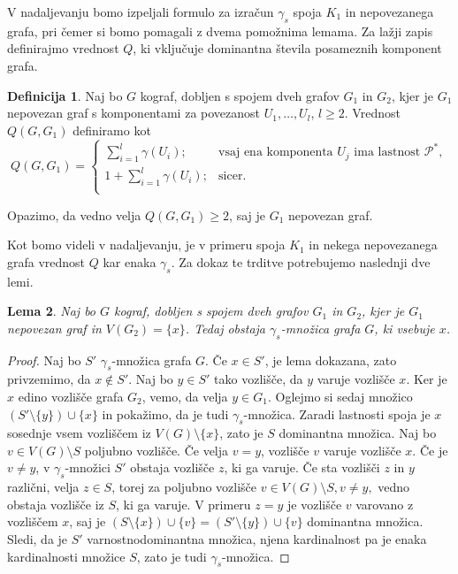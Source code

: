 \documentclass[12pt,a4paper,twoside]{article}
\theoremstyle{definition} %
\newtheorem{definicija}{Definicija}[section]
\theoremstyle{plain} %
\newtheorem{lema}[definicija]{Lema}
\numberwithin{equation}{section}  %
\begin{document}
V nadaljevanju bomo izpeljali formulo za izračun $\gamma_s$ spoja $K_1$ in nepovezanega grafa, pri čemer si bomo pomagali z dvema pomožnima lemama. Za lažji zapis definirajmo vrednost $Q$, ki vključuje dominantna števila posameznih komponent grafa.

\begin{definicija}Naj bo $G$ kograf, dobljen s spojem dveh grafov $G_1$ in $G_2$, kjer je $G_1$ nepovezan graf s komponentami za povezanost $U_1, \dots, U_l$, $l \geq 2$. Vrednost $Q(G, G_1)$ definiramo kot
$$Q(G, G_1) = 
  \begin{cases}
    \sum\limits_{i=1}^l \gamma(U_i); & \text{vsaj ena komponenta } U_j \text{ ima lastnost } \mathcal{P^*}, \\
    1 + \sum\limits_{i=1}^l \gamma(U_i); & \text{sicer. }\\
  \end{cases}
  $$
\end{definicija}
Opazimo, da vedno velja $Q(G, G_1) \geq 2$, saj je $G_1$ nepovezan graf.

Kot bomo videli v nadaljevanju, je v primeru spoja $K_1$ in nekega nepovezanega grafa vrednost $Q$ kar enaka $\gamma_s$. Za dokaz te trditve potrebujemo naslednji dve lemi.

\begin{lema}\label{Lema6}Naj bo $G$ kograf, dobljen s spojem dveh grafov $G_1$ in $G_2$, kjer je $G_1$ nepovezan graf in $V(G_2) = \{x\}$. Tedaj obstaja $\gamma_s$-množica grafa $G$, ki vsebuje $x$.
\end{lema}
\begin{proof}
Naj bo $S'$ $\gamma_s$-množica grafa $G$. Če $x \in S'$, je lema dokazana, zato privzemimo, da $x \not\in S'$. Naj bo $y\in S'$ tako vozlišče, da $y$ varuje vozlišče $x$. Ker je $x$ edino vozlišče grafa $G_2$, vemo, da velja $y \in G_1$. Oglejmo si sedaj množico $(S' \setminus \{y\}) \cup \{x\}$ in pokažimo, da je tudi $\gamma_s$-množica. Zaradi lastnosti spoja je $x$ sosednje vsem vozliščem iz $V(G) \setminus \{x\}$, zato je $S$ dominantna množica. Naj bo $v \in V(G) \setminus S$ poljubno vozlišče. Če velja $v=y$, vozlišče $v$ varuje vozlišče $x$. Če je $v \neq y$, v $\gamma_s$-množici $S'$ obstaja vozlišče $z$, ki ga varuje. Če sta vozlišči $z$ in $y$ različni, velja $z \in S$, torej za poljubno vozlišče $v \in V(G) \setminus S, v \neq y,$ vedno obstaja vozlišče iz $S$, ki ga varuje. V primeru $z = y$ je vozlišče $v$ varovano z vozliščem $x$, saj je $(S \setminus \{x\}) \cup \{v\} = (S' \setminus \{y\}) \cup \{v\}$ dominantna množica. Sledi, da je $S'$ varnostnodominantna množica, njena kardinalnost pa je enaka kardinalnosti množice $S$, zato je tudi $\gamma_s$-množica.
\end{proof}
\end{document}
